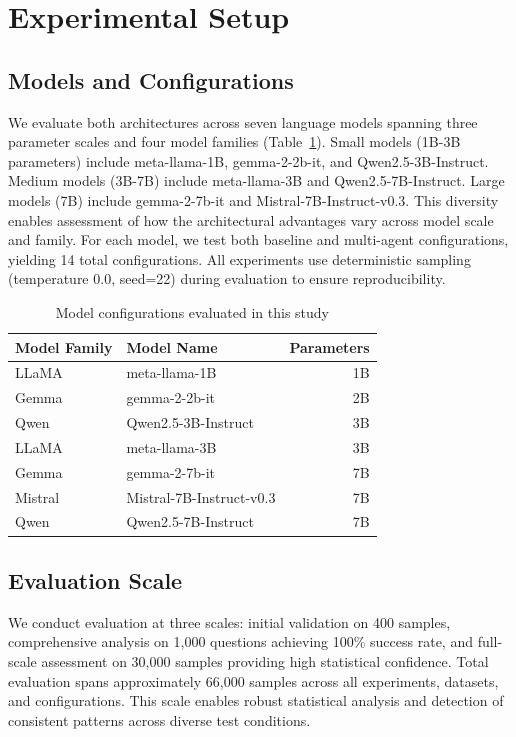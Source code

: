 \section{Experimental Setup}\label{sec:experiments}

\subsection{Models and Configurations}

We evaluate both architectures across seven language models spanning three parameter scales and four model families (Table~\ref{tab:models}). Small models (1B-3B parameters) include meta-llama-1B, gemma-2-2b-it, and Qwen2.5-3B-Instruct. Medium models (3B-7B) include meta-llama-3B and Qwen2.5-7B-Instruct. Large models (7B) include gemma-2-7b-it and Mistral-7B-Instruct-v0.3. This diversity enables assessment of how the architectural advantages vary across model scale and family. For each model, we test both baseline and multi-agent configurations, yielding 14 total configurations. All experiments use deterministic sampling (temperature 0.0, seed=22) during evaluation to ensure reproducibility.

\begin{table}[t]
\centering
\caption{Model configurations evaluated in this study}
\label{tab:models}
\begin{tabular}{llr}
\toprule
\textbf{Model Family} & \textbf{Model Name} & \textbf{Parameters} \\
\midrule
LLaMA & meta-llama-1B & 1B \\
Gemma & gemma-2-2b-it & 2B \\
Qwen & Qwen2.5-3B-Instruct & 3B \\
LLaMA & meta-llama-3B & 3B \\
Gemma & gemma-2-7b-it & 7B \\
Mistral & Mistral-7B-Instruct-v0.3 & 7B \\
Qwen & Qwen2.5-7B-Instruct & 7B \\
\bottomrule
\end{tabular}
\end{table}

\subsection{Evaluation Scale}

We conduct evaluation at three scales: initial validation on 400 samples, comprehensive analysis on 1,000 questions achieving 100\% success rate, and full-scale assessment on 30,000 samples providing high statistical confidence. Total evaluation spans approximately 66,000 samples across all experiments, datasets, and configurations. This scale enables robust statistical analysis and detection of consistent patterns across diverse test conditions.

